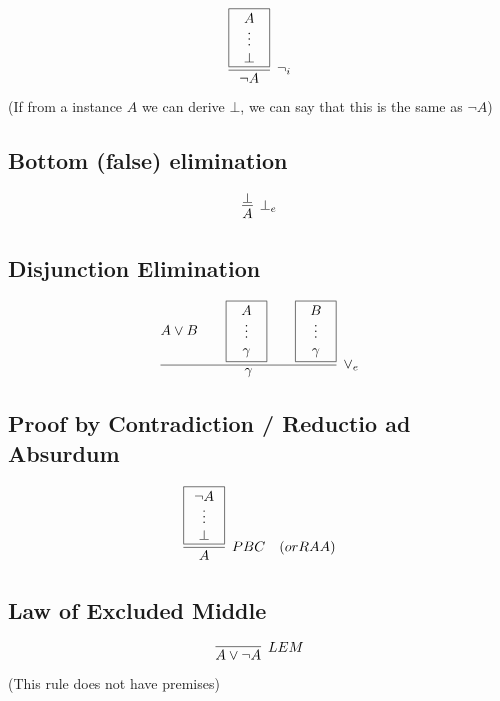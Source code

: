 \documentclass{article}
\newcommand{\rulename}[1]{#1}
\begin{document}
      \begin{align*}
        \infer[\rulename{\neg_i}]
        {\neg A}
        {
          \framebox{\parbox{.8cm}{\centerline{$A$}\centerline{$\vdots$}\centerline{$\bot$}}}
        }
      \end{align*}
      (If from a instance $A$ we can derive $\bot$, we can say that this is the same as $\neg A$)
      
  \subsection*{Bottom (false) elimination}
      \begin{align*}
        \infer[\rulename{\bot_e}]
        {A}
        {\bot}
      \end{align*}
      
  \subsection*{Disjunction Elimination}
      \begin{align*}
        \infer[\rulename{\vee_e}]
        {\gamma}
        {
          A \vee B && 
          \framebox{\parbox{.8cm}{\centerline{$A$}\centerline{$\vdots$}\centerline{$\gamma$}}} 
          &&
          \framebox{\parbox{.8cm}{\centerline{$B$}\centerline{$\vdots$}\centerline{$\gamma$}}} 
        }
      \end{align*}

  \subsection*{Proof by Contradiction / Reductio ad Absurdum}
      \begin{align*}
          \infer[\rulename{PBC} \quad (or \rulename{RAA})]
        {A}
        {\framebox{\parbox{.8cm}{\centerline{$\neg A$}\centerline{$\vdots$}\centerline{$\bot$}}}}
      \end{align*}

  \subsection*{Law of Excluded Middle}
      \vspace{3ex}
      \begin{align*}
         \infer[\rulename{LEM}]
        {A \vee \neg A}
        {
        } 
      \end{align*}
      (This rule does not have premises)
      
\end{document}
